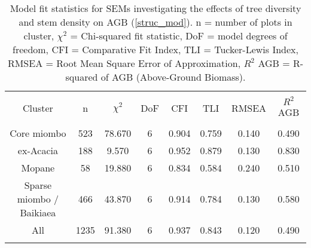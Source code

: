 
\begin{table}[!htbp] \centering 
  	\caption{Model fit statistics for SEMs investigating the effects of tree diversity and stem density on AGB (\autoref{struc_mod}). n = number of plots in cluster, $\chi^{2}$ = Chi-squared fit statistic, DoF = model degrees of freedom, CFI = Comparative Fit Index, TLI = Tucker-Lewis Index, RMSEA = Root Mean Square Error of Approximation, $R^{2}$ AGB = R-squared of AGB (Above-Ground Biomass).} 
  \label{struc_model_fit_clust_stats} 
\begin{tabular}{@{\extracolsep{0pt}} cccccccc} 
\\[-1.8ex]\hline 
\hline \\[-1.8ex] 
{Cluster} & {n} & {$\chi^{2}$} & {DoF} & {CFI} & {TLI} & {RMSEA} & {$R^{2}$ AGB} \\
\hline \\[-1.8ex] 
Core miombo & 523 & 78.670 & 6 & 0.904 & 0.759 & 0.140 & 0.490 \\ 
ex-Acacia & 188 & 9.570 & 6 & 0.952 & 0.879 & 0.130 & 0.830 \\ 
Mopane & 58 & 19.880 & 6 & 0.834 & 0.584 & 0.240 & 0.510 \\ 
Sparse miombo / Baikiaea & 466 & 43.870 & 6 & 0.914 & 0.784 & 0.130 & 0.580 \\ 
All & 1235 & 91.380 & 6 & 0.937 & 0.843 & 0.120 & 0.490 \\ 
\hline \\[-1.8ex] 
\end{tabular} 
\end{table} 
